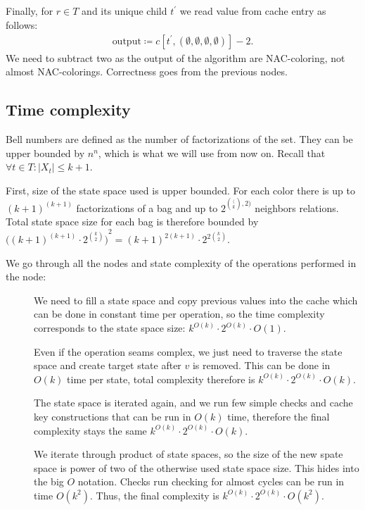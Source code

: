 \subsection{\RootNode{}}

Finally, for \( r \in T \) \RootNode{} and its unique child \( t^\prime \)
we read value from cache entry as follows:
%
\begin{align*}
	\text{output} \coloneqq c[t^\prime, (\emptyset,\emptyset,\emptyset,\emptyset)] - 2.
\end{align*}
%
We need to subtract two as the output of the algorithm are NAC-coloring,
not almost NAC-colorings. Correctness goes from the previous nodes.

\subsection{Time complexity}

Bell numbers are defined as the number of factorizations of the set.
They can be upper bounded by \( n^n \), which is what we will use from now on.
Recall that \( \forall t \in T : |X_t| \le k+1 \).

First, size of the state space used is upper bounded.
For each color there is up to \( {(k+1)}^{(k+1)} \) factorizations of a bag and
up to \( 2^{\binom(k, 2)} \) neighbors relations.
Total state space size for each bag is therefore bounded by
\( {\big({(k+1)}^{(k+1)} \cdot 2^{\binom{k}{2}} \big)}^2 = {(k+1)}^{2(k+1)} \cdot 2^{2 \binom{k}{2}} \).

We go through all the nodes and state complexity of the operations performed in the node:
\begin{description}
	\item[\IntroduceVertexNode{}]
	      We need to fill a state space and copy previous values into the cache
	      which can be done in constant time per operation,
	      so the time complexity corresponds to the state space size:
	      \( {k}^{O(k)} \cdot 2^{O(k)} \cdot O(1) \).
	\item[\ForgetVertexNode{}]
	      Even if the operation seams complex, we just need to traverse the state space
	      and create target state after \( v \) is removed. This can be done in \( O(k) \) time
	      per state, total complexity therefore is
	      \( {k}^{O(k)} \cdot 2^{O(k)} \cdot O(k) \).
	\item[\IntroduceEdgeNode{}]
	      The state space is iterated again, and we run few simple checks and cache key constructions
	      that can be run in \( O(k) \) time, therefore the final complexity stays the same
	      \( {k}^{O(k)} \cdot 2^{O(k)} \cdot O(k) \).
	\item[\JoinNode{}]
	      We iterate through product of state spaces,
	      so the size of the new spate space is power of two
	      of the otherwise used state space size.
	      This hides into the big \( O \) notation.
	      Checks run checking for almost cycles can be run in time \( O(k^2) \).
	      Thus, the final		complexity is
	      \( {k}^{O(k)} \cdot 2^{O(k)} \cdot O(k^2) \).
\end{description}

